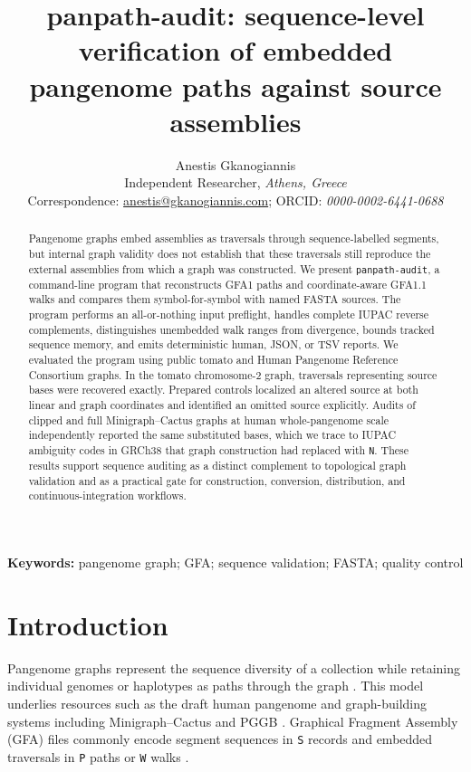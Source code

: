 \documentclass[10pt]{article}
\title{\textbf{panpath-audit: sequence-level verification of embedded pangenome paths against source assemblies}}
\author{Anestis Gkanogiannis\\
\small Independent Researcher, \textit{Athens, Greece}\\
\small Correspondence: \href{mailto:anestis@gkanogiannis.com}{anestis@gkanogiannis.com}; ORCID: \textit{0000-0002-6441-0688}}
\date{}
\newcommand{\software}[1]{\texttt{#1}}
\begin{document}
\maketitle

\begin{abstract}
Pangenome graphs embed assemblies as traversals through sequence-labelled
segments, but internal graph validity does not establish that these traversals
still reproduce the external assemblies from which a graph was constructed.
We present \software{panpath-audit}, a command-line program that reconstructs
GFA1 paths and coordinate-aware GFA1.1 walks and compares them symbol-for-symbol
with named FASTA sources. The program performs an all-or-nothing input preflight,
handles complete IUPAC reverse complements, distinguishes unembedded walk ranges
from divergence, bounds tracked sequence memory, and emits deterministic human,
JSON, or TSV reports. We evaluated the program using public tomato and Human
Pangenome Reference Consortium graphs. In the tomato chromosome-2 graph,
\TomatoIdentical{} traversals representing \TomatoSourceBases{} source bases
were recovered exactly. Prepared controls localized an altered
\TomatoDivergentIdentifier{} source at both linear and graph coordinates and
identified an omitted \TomatoMissingIdentifier{} source explicitly. Audits of
clipped and full Minigraph--Cactus graphs at human whole-pangenome scale
independently reported the same \HprcClippedSubstituted{} substituted bases,
which we trace to IUPAC ambiguity codes in GRCh38 that graph construction had
replaced with \texttt{N}. These results support sequence auditing as
a distinct complement to topological graph validation and as a practical gate
for construction, conversion, distribution, and continuous-integration
workflows.
\end{abstract}

\textbf{Keywords:} pangenome graph; GFA; sequence validation; FASTA; quality control

\section{Introduction}

Pangenome graphs represent the sequence diversity of a collection while
retaining individual genomes or haplotypes as paths through the graph
\cite{eizenga2020pangenome}. This model underlies resources such as the draft
human pangenome \cite{liao2023draft} and graph-building systems including
Minigraph--Cactus \cite{hickey2023minigraph} and PGGB
\cite{garrison2024pggb}. Graphical Fragment Assembly (GFA) files commonly encode
segment sequences in \texttt{S} records and embedded traversals in \texttt{P}
paths or \texttt{W} walks \cite{gfaspec}.
\end{document}
